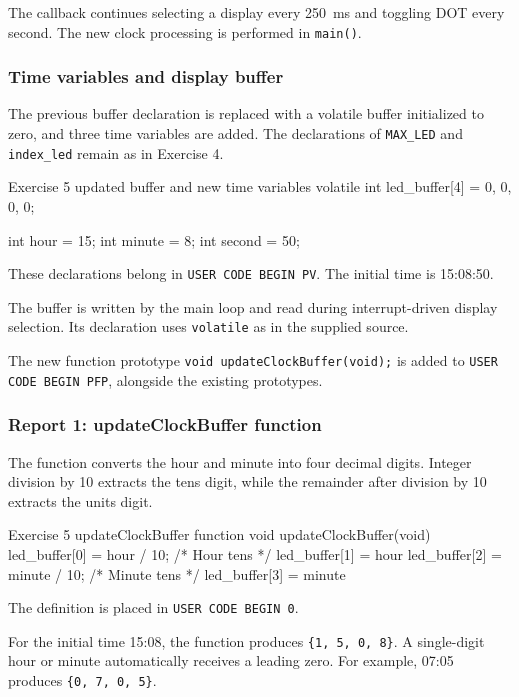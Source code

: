 \documentclass[a4paper]{article}
\begin{document}
The callback continues selecting a display every
250~ms and toggling DOT every second.
The new clock processing is performed in
\texttt{main()}.

\subsubsection{Time variables and display buffer}

The previous buffer declaration is replaced with
a volatile buffer initialized to zero, and three
time variables are added. The declarations of
\texttt{MAX\_LED} and \texttt{index\_led} remain
as in Exercise 4.

\begin{stmcode}{Exercise 5 updated buffer and new time variables}
volatile int led_buffer[4] = {0, 0, 0, 0};

int hour = 15;
int minute = 8;
int second = 50;
\end{stmcode}

These declarations belong in
\texttt{USER CODE BEGIN PV}.
The initial time is 15:08:50.

The buffer is written by the main loop and read
during interrupt-driven display selection.
Its declaration uses \texttt{volatile} as in
the supplied source.

The new function prototype
\texttt{void updateClockBuffer(void);}
is added to \texttt{USER CODE BEGIN PFP},
alongside the existing prototypes.

\subsubsection{Report 1: updateClockBuffer function}

The function converts the hour and minute into
four decimal digits. Integer division by 10
extracts the tens digit, while the remainder
after division by 10 extracts the units digit.

\begin{stmcode}{Exercise 5 updateClockBuffer function}
void updateClockBuffer(void){
    led_buffer[0] = hour / 10;    /* Hour tens */
    led_buffer[1] = hour %
    led_buffer[2] = minute / 10;  /* Minute tens */
    led_buffer[3] = minute %
}
\end{stmcode}

The definition is placed in
\texttt{USER CODE BEGIN 0}.

For the initial time 15:08, the function produces
\texttt{\{1, 5, 0, 8\}}. A single-digit hour
or minute automatically receives a leading zero.
For example, 07:05 produces
\texttt{\{0, 7, 0, 5\}}.
\end{document}
